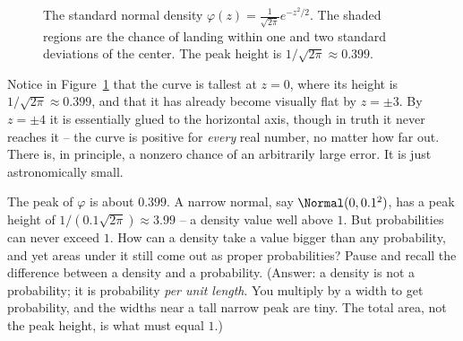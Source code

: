 \begin{figure}[H]
\centering
{}
\caption{The standard normal density $\varphi(z) = \frac{1}{\sqrt{2\pi}}e^{-z^2/2}$.
The shaded regions are the chance of landing within one and two standard
deviations of the center. The peak height is $1/\sqrt{2\pi}\approx 0.399$.}
\label{ch12:fig-standard}
\end{figure}

Notice in Figure~\ref{ch12:fig-standard} that the curve is tallest at $z=0$,
where its height is $1/\sqrt{2\pi}\approx 0.399$, and that it has already become
visually flat by $z = \pm 3$. By $z = \pm 4$ it is essentially glued to the
horizontal axis, though in truth it never reaches it -- the curve is positive for
\emph{every} real number, no matter how far out. There is, in principle, a
nonzero chance of an arbitrarily large error. It is just astronomically small.

\begin{walkbox}
The peak of $\varphi$ is about $0.399$. A narrow normal, say $\Normal(0, 0.1^2)$,
has a peak height of $1/(0.1\sqrt{2\pi})\approx 3.99$ -- a density value well above
$1$. But probabilities can never exceed $1$. How can a density take a value bigger
than any probability, and yet areas under it still come out as proper
probabilities? Pause and recall the difference between a density and a
probability. (Answer: a density is not a probability; it is probability \emph{per
unit length}. You multiply by a width to get probability, and the widths near a
tall narrow peak are tiny. The total area, not the peak height, is what must
equal $1$.)
\end{walkbox}

